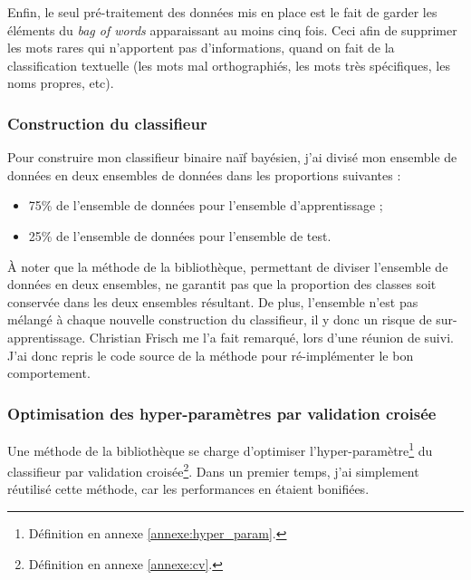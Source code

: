                 Enfin, le seul pré-traitement des données mis en place est le fait de garder les éléments du \textit{bag of words} apparaissant au moins cinq fois. Ceci afin de supprimer les mots rares qui n'apportent pas d'informations, quand on fait de la classification textuelle (les mots mal orthographiés, les mots très spécifiques, les noms propres, etc).

            \subsubsection{Construction du classifieur}
                Pour construire mon classifieur binaire naïf bayésien, j'ai divisé mon ensemble de données en deux ensembles de données dans les proportions suivantes :
                \begin{itemize}
                    \item 75\% de l'ensemble de données pour l'ensemble d'apprentissage ;
                    \item 25\% de l'ensemble de données pour l'ensemble de test.\\
                \end{itemize}
                À noter que la méthode de la bibliothèque, permettant de diviser l'ensemble de données en deux ensembles, ne garantit pas que la proportion des classes soit conservée dans les deux ensembles résultant. De plus, l'ensemble n'est pas mélangé à chaque nouvelle construction du classifieur, il y donc un risque de sur-apprentissage. Christian Frisch me l'a fait remarqué, lors d'une réunion de suivi. J'ai donc repris le code source de la méthode pour ré-implémenter le bon comportement.

            \subsubsection{Optimisation des hyper-paramètres par validation croisée}
                Une méthode de la bibliothèque se charge d'optimiser l'hyper-paramètre\footnote{Définition en annexe \ref{annexe:hyper_param}.} du classifieur par validation croisée\footnote{Définition en annexe \ref{annexe:cv}.}. Dans un premier temps, j'ai simplement réutilisé cette méthode, car les performances en étaient bonifiées.

